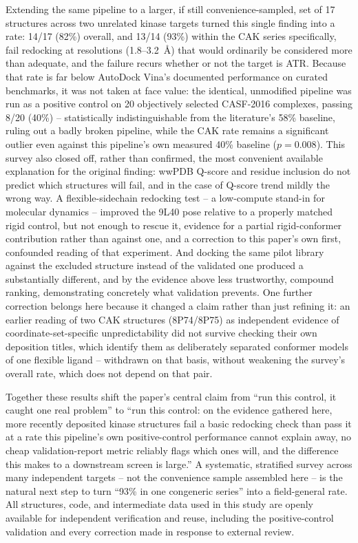 \documentclass[11pt]{article}
\begin{document}
Extending the same pipeline to a larger, if still convenience-sampled, set
of 17 structures across two unrelated kinase targets turned this single
finding into a rate: 14/17 (82\%) overall, and 13/14 (93\%) within the
CAK series specifically, fail redocking at resolutions (1.8--3.2~{\AA})
that would ordinarily be considered more than adequate, and the failure
recurs whether or not the target is ATR. Because that rate is far below
AutoDock Vina's documented performance on curated benchmarks, it was not
taken at face value: the identical, unmodified pipeline was run as a
positive control on 20 objectively selected CASF-2016 complexes,
passing 8/20 (40\%) -- statistically indistinguishable from the
literature's 58\% baseline, ruling out a badly broken pipeline, while the
CAK rate remains a significant outlier even against this pipeline's own
measured 40\% baseline ($p=0.008$). This survey also closed off, rather
than confirmed, the most convenient available explanation for the
original finding: wwPDB Q-score and residue inclusion do not predict
which structures will fail, and in the case of Q-score trend mildly the
wrong way. A flexible-sidechain redocking test -- a low-compute stand-in
for molecular dynamics -- improved the 9L40 pose relative to a properly
matched rigid control, but not enough to rescue it, evidence for a partial
rigid-conformer contribution rather than against one, and a correction to
this paper's own first, confounded reading of that experiment. And
docking the same pilot library against the excluded structure instead of
the validated one produced a substantially different, and by the evidence
above less trustworthy, compound ranking, demonstrating concretely what
validation prevents. One further correction belongs here because it
changed a claim rather than just refining it: an earlier reading of two
CAK structures (8P74/8P75) as independent evidence of coordinate-set-specific
unpredictability did not survive checking their own deposition titles,
which identify them as deliberately separated conformer models of one
flexible ligand -- withdrawn on that basis, without weakening the
survey's overall rate, which does not depend on that pair.

Together these results shift the paper's central claim from ``run this
control, it caught one real problem'' to ``run this control: on the
evidence gathered here, more recently deposited kinase structures fail a
basic redocking check than pass it at a rate this pipeline's own
positive-control performance cannot explain away, no cheap
validation-report metric reliably flags which ones will, and the
difference this makes to a downstream screen is large.'' A systematic,
stratified survey across many independent targets -- not the convenience
sample assembled here -- is the natural next step to turn ``93\% in one
congeneric series'' into a field-general rate. All structures, code, and
intermediate data used in this study are openly available for independent
verification and reuse, including the positive-control validation and
every correction made in response to external review.
\end{document}

